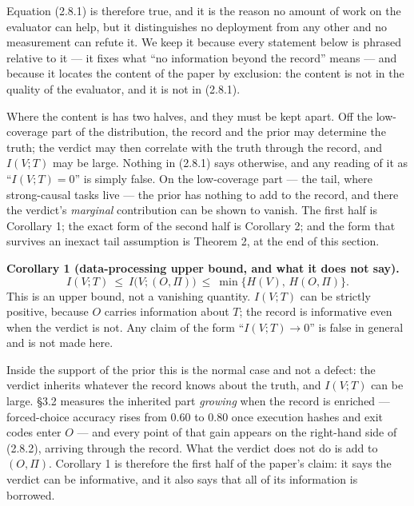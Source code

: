 \documentclass[11pt,a4paper]{article}
\begin{document}
Equation (2.8.1) is therefore true, and it is the reason no amount of work on the
evaluator can help, but it distinguishes no deployment from any other and no
measurement can refute it. We keep it because every statement below is phrased
relative to it --- it fixes what ``no information beyond the record'' means --- and
because it locates the content of the paper by exclusion: the content is not in the
quality of the evaluator, and it is not in (2.8.1).

Where the content is has two halves, and they must be kept apart. Off the
low-coverage part of the distribution, the record and the prior may determine the
truth; the verdict may then correlate with the truth through the record, and
\(I(V;T)\) may be large. Nothing in (2.8.1) says otherwise, and any reading of it as
``\(I(V;T)=0\)'' is simply false. On the low-coverage part --- the tail, where
strong-causal tasks live --- the prior has nothing to add to the record, and there
the verdict's \emph{marginal} contribution can be shown to vanish. The first half is
Corollary 1; the exact form of the second half is Corollary 2; and the form that
survives an inexact tail assumption is Theorem 2, at the end of this section.

\textbf{Corollary 1 (data-processing upper bound, and what it does not say).}
\begin{equation}
I(V;T)\ \le\ I\big(V;(O,\Pi)\big)\ \le\ \min\big\{H(V),\,H(O,\Pi)\big\}.
\tag{2.8.2}
\end{equation}
This is an upper bound, not a vanishing quantity. \(I(V;T)\) can be strictly
positive, because \(O\) carries information about \(T\); the record is informative
even when the verdict is not. Any claim of the form ``\(I(V;T)\to0\)'' is false in
general and is not made here.

Inside the support of the prior this is the normal case and not a defect: the
verdict inherits whatever the record knows about the truth, and \(I(V;T)\) can be
large. §3.2 measures the inherited part \emph{growing} when the record is enriched ---
forced-choice accuracy rises from \(0.60\) to \(0.80\) once execution hashes and exit
codes enter \(O\) --- and every point of that gain appears on the right-hand side of
(2.8.2), arriving through the record. What the verdict does not do is add to
\((O,\Pi)\). Corollary 1 is therefore the first half of the paper's claim: it says
the verdict can be informative, and it also says that all of its information is
borrowed.
\end{document}
